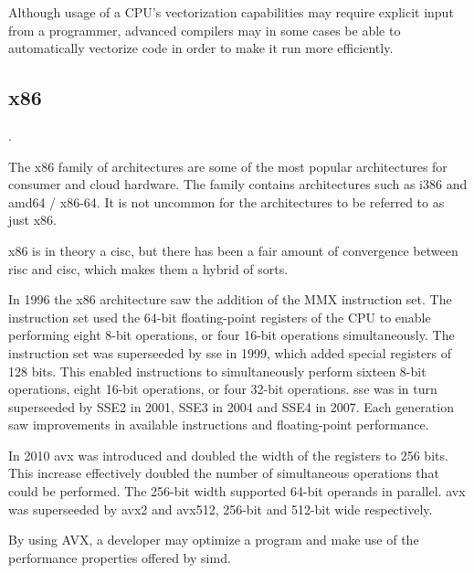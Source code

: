 Although usage of a CPU's vectorization capabilities may require explicit input from a programmer, advanced compilers may in some cases be able to automatically vectorize code in order to make it run more efficiently\cite{dickson2011}.

\subsection{x86}

.


The \gls{x86} family of architectures are some of the most popular architectures for consumer and cloud hardware. The family contains architectures such as i386 and amd64 / x86-64. It is not uncommon for the architectures to be referred to as just \gls{x86}\cite{carter2002}.

\gls{x86} is in theory a \gls{cisc}, but there has been a fair amount of convergence between \gls{risc} and \gls{cisc}, which makes them a hybrid of sorts\cite{carter2002}.

In 1996 the x86 architecture saw the addition of the MMX instruction set. The instruction set used the 64-bit floating-point registers of the CPU to enable performing eight 8-bit operations, or four 16-bit operations simultaneously. The instruction set was superseeded by \gls{sse} in 1999, which added special registers of 128 bits. This enabled instructions to simultaneously perform sixteen 8-bit operations, eight 16-bit operations, or four 32-bit operations. \gls{sse} was in turn superseeded by SSE2 in 2001, SSE3 in 2004 and SSE4 in 2007. Each generation saw improvements in available instructions and floating-point performance\cite{hennessy2011:avx}.

In 2010 \gls{avx} was introduced and doubled the width of the registers to 256 bits. This increase effectively doubled the number of simultaneous operations that could be performed. The 256-bit width supported 64-bit operands in parallel\cite{hennessy2011:avx}. \gls{avx} was superseeded by \gls{avx2} and \gls{avx512}, 256-bit\cite{intel:avx2} and 512-bit\cite{intel:avx512} wide respectively.


By using AVX, a developer may optimize a program and make use of the performance properties offered by \gls{simd}\cite{hennessy2011:avx}.

